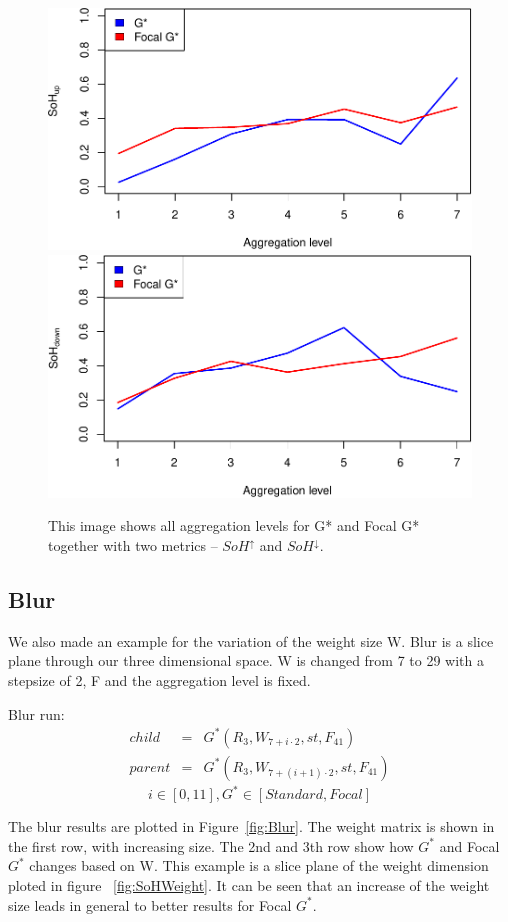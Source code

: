 \documentclass{itatnew}
\begin{document}
\begin{figure}[htp]
  \includegraphics[width=.45\linewidth]{images/gen-zoom-sohup-1}
  \hspace{1em}
  \includegraphics[width=.45\linewidth]{images/gen-zoom-sohdown-1}
  
  \caption{
    This image shows all aggregation levels for G* and Focal G* together 
    with two metrics -- $SoH^\uparrow$ and $SoH^\downarrow$.
  }
  \label{fig:Zoom}
\end{figure}

\subsection{Blur}
We also made an example for the variation of the weight size W.
Blur is a slice plane through our three dimensional space. 
W is changed from 7 to 29 with a stepsize of 2, F and the aggregation level is fixed.
\begin{definition} Blur run:
\begin{eqnarray*}
    child & = & G^*(R_3, W_{7+i \cdot 2}, st, F_{41}) \\
    parent & = & G^*(R_3, W_{7+(i+1)\cdot 2}, st, F_{41})
  \end{eqnarray*}
\begin{displaymath}
i \in [0,11], G^* \in [Standard, Focal]
\end{displaymath}
\end{definition}
The blur results are plotted in Figure~\ref{fig:Blur}. The weight matrix is
shown in the first row, with increasing size. The 2nd and 3th row show how
$G^*$ and Focal $G^*$ changes based on W. This example is a slice plane of the
weight dimension ploted in figure ~\ref{fig:SoHWeight}. It can be seen that an
increase of the weight size leads in general to better results for Focal $G^*$.
\end{document}
